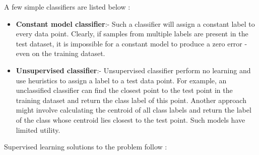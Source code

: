 \documentclass[12pt]{article}
\begin{document}
A few simple classifiers are listed below :
\begin{itemize}
    \item \textbf{Constant model classifier}:- Such a classifier will assign a constant label to every data point. Clearly, if samples from multiple labels are present in the test dataset, it is impossible for a constant model to produce a zero error - even on the training dataset.
    \item \textbf{Unsupervised classifier}:- Unsupervised classifier perform no learning and use heuristics to assign a label to a test data point. For example, an unclassified classifier can find the closest point to the test point in the training dataset and return the class label of this point. Another approach might involve calculating the centroid of all class labels and return the label of the class whose centroid lies closest to the test point. Such models have limited utility.
\end{itemize}
Supervised learning solutions to the problem follow :
\end{document}
